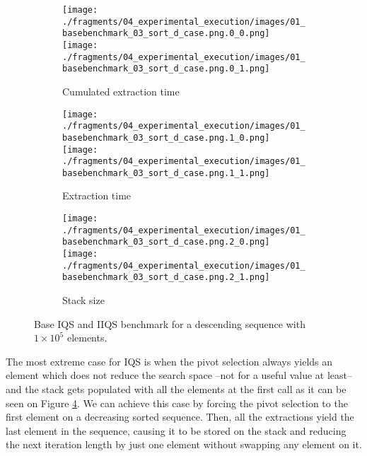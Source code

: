 \begin{figure}
    \centering
    \begin{subfigure}[b]{\textwidth}
        \centering
        \texttt{[image: ./fragments/04\_experimental\_execution/images/01\_basebenchmark\_03\_sort\_d\_case.png.0\_0.png]}
        \texttt{[image: ./fragments/04\_experimental\_execution/images/01\_basebenchmark\_03\_sort\_d\_case.png.0\_1.png]}
        \caption{Cumulated extraction time}
        \label{FIG:BENCHMARK_03_DESC_CASE__0_0}
    \end{subfigure}

    \begin{subfigure}[b]{\textwidth}
        \centering
        \texttt{[image: ./fragments/04\_experimental\_execution/images/01\_basebenchmark\_03\_sort\_d\_case.png.1\_0.png]}
        \texttt{[image: ./fragments/04\_experimental\_execution/images/01\_basebenchmark\_03\_sort\_d\_case.png.1\_1.png]}
        \caption{Extraction time}
        \label{FIG:BENCHMARK_03_DESC_CASE__0_1}
    \end{subfigure}

    \begin{subfigure}[b]{\textwidth}
        \centering
        \texttt{[image: ./fragments/04\_experimental\_execution/images/01\_basebenchmark\_03\_sort\_d\_case.png.2\_0.png]}
        \texttt{[image: ./fragments/04\_experimental\_execution/images/01\_basebenchmark\_03\_sort\_d\_case.png.2\_1.png]}
        \caption{Stack size}
        \label{FIG:BENCHMARK_03_DESC_CASE__0_2}
    \end{subfigure}
    
    \caption{Base IQS and IIQS benchmark for a descending sequence with $1\times10^5$ elements.}
    \label{FIG:BENCHMARK_03_DESC_CASE}
\end{figure}

The most extreme case for IQS is when the pivot selection always yields an element which does not reduce the search space --not for a useful value at least-- and the stack gets populated with all the elements at the first call as it can be seen on Figure \ref{FIG:BENCHMARK_03_DESC_CASE}. We can achieve this case by forcing the pivot selection to the first element on a decreasing sorted sequence. Then, all the extractions yield the last element in the sequence, causing it to be stored on the stack and reducing the next iteration length by just one element without swapping any element on it.\\

